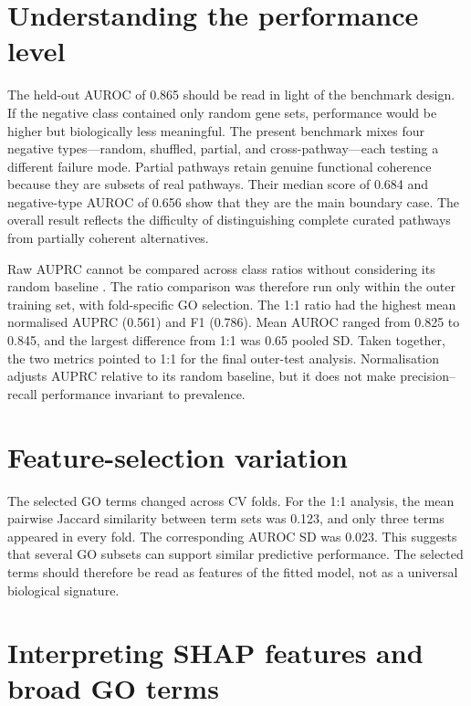 \documentclass[12pt,letterpaper,oneside,openany]{book}
\begin{document}
\section{Understanding the performance level}
\label{sec:disc_performance}

The held-out AUROC of 0.865 should be read in light of the benchmark design. If the negative class contained only random gene sets, performance would be higher but biologically less meaningful. The present benchmark mixes four negative types---random, shuffled, partial, and cross-pathway---each testing a different failure mode. Partial pathways retain genuine functional coherence because they are subsets of real pathways. Their median score of 0.684 and negative-type AUROC of 0.656 show that they are the main boundary case. The overall result reflects the difficulty of distinguishing complete curated pathways from partially coherent alternatives.

Raw AUPRC cannot be compared across class ratios without considering its random baseline \citep{saito2015precision}. The ratio comparison was therefore run only within the outer training set, with fold-specific GO selection. The 1:1 ratio had the highest mean normalised AUPRC (0.561) and F1 (0.786). Mean AUROC ranged from 0.825 to 0.845, and the largest difference from 1:1 was 0.65 pooled SD. Taken together, the two metrics pointed to 1:1 for the final outer-test analysis. Normalisation adjusts AUPRC relative to its random baseline, but it does not make precision--recall performance invariant to prevalence.

\section{Feature-selection variation}
\label{sec:disc_feature_variation}

The selected GO terms changed across CV folds. For the 1:1 analysis, the mean pairwise Jaccard similarity between term sets was 0.123, and only three terms appeared in every fold. The corresponding AUROC SD was 0.023. This suggests that several GO subsets can support similar predictive performance. The selected terms should therefore be read as features of the fitted model, not as a universal biological signature.

\section{Interpreting SHAP features and broad GO terms}
\label{sec:disc_shap_interpretation}
\end{document}
